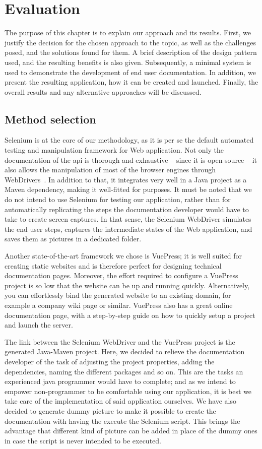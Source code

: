 \chapter{Evaluation}\label{ch:eval}
The purpose of this chapter is to explain our approach and its results. First, we justify the decision for the chosen approach to the topic, as well as the challenges posed, and the solutions found for them. A brief description of the design pattern used, and the resulting benefits is also given. Subsequently, a minimal system is used to demonstrate the development of end user documentation. In addition, we present the resulting application, how it can be created and launched. Finally, the overall results and any alternative approaches will be discussed.

\section{Method selection}\label{sec:meth}

Selenium is at the core of our methodology, as it is per se the default automated testing and manipulation framework for Web application. Not only the documentation of the \gls*{api} is thorough and exhaustive -- since it is open-source -- it also allows the manipulation of most  of the browser engines through WebDrivers~\cite{sel}. In addition to that, it integrates very well in a Java project  as a Maven dependency, making it well-fitted for purposes. It must be noted that we do not intend to use Selenium for testing our application, rather than for automatically replicating the steps the documentation developer would have to take to create screen captures. In that sense, the Selenium WebDriver simulates the end user steps, captures the intermediate states of the Web application, and saves them as pictures in a dedicated folder.

Another state-of-the-art framework we chose is VuePress; it is well suited for creating static websites and is therefore perfect for designing technical documentation pages. Moreover, the effort required to configure a VuePress project is so low that the website can be up and running quickly. Alternatively, you can effortlessly bind the generated website to an existing domain, for example a company wiki page or similar. VuePress also has a great online documentation page, with a step-by-step guide on how to quickly setup a project and launch the server.

The link between the Selenium WebDriver and the VuePress project is the generated Java-Maven project. Here, we decided to relieve the documentation developer of the task of adjusting the project properties, adding the dependencies, naming the different packages and so on. This are the tasks an experienced java programmer would have to complete; and as we intend to empower non-programmer to be comfortable using our application, it is best we take care of the implementation of said application ourselves. We have also decided to generate dummy picture to make it possible to create the documentation with having the execute the Selenium script. This brings the advantage that different kind of picture can be added in place of the dummy ones in case the script is never intended to be executed.

